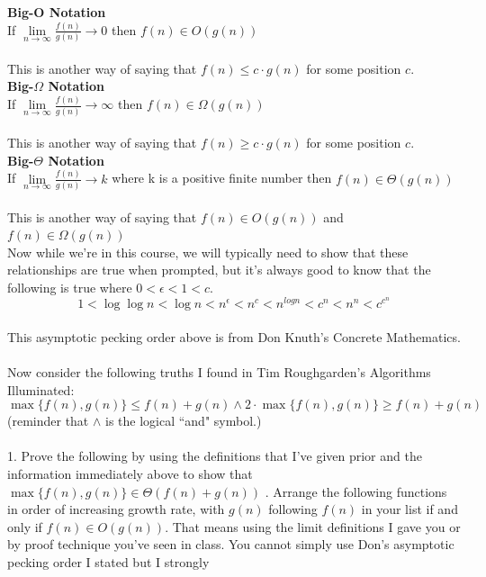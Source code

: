 \documentclass[12pt]{article}
\begin{document}
\textbf{Big-O Notation}\\
If $\lim\limits_{n\to\infty}{\frac{f(n)}{g(n)}}\to0$ then $f(n) \in O(g(n))$\\\\
This is another way of saying that $f(n) \leq c \cdot g(n)$ for some position $c$.\\
\textbf{Big-$\Omega$ Notation}\\
If $\lim\limits_{n\to\infty}{\frac{f(n)}{g(n)}}\to\infty$ then $f(n) \in \Omega(g(n))$\\\\
This is another way of saying that $f(n) \geq c \cdot g(n)$ for some position $c$.\\
\textbf{Big-$\Theta$ Notation}\\
If $\lim\limits_{n\to\infty}{\frac{f(n)}{g(n)}}\to k$ where k is a positive finite number then $f(n) \in \Theta(g(n))$\\\\
This is another way of saying that $f(n) \in O(g(n))$ and $f(n) \in \Omega(g(n))$\.\\
Now while we're in this course, we will typically need to show that these relationships are true when prompted, but it's always good to know that the following is true where \begin{math}0 < \epsilon < 1 < c\end{math}.\\
\[1 < \log{\log{n}} < \log{n} < n^{\epsilon} < n^c < n^{log{n}} < c^n < n^n < c^{c^{n}}\]\\
This asymptotic pecking order above is from Don Knuth's Concrete Mathematics.\\\\
\newpage
Now consider the following truths I found in Tim Roughgarden's Algorithms Illuminated: \\
$$\max\{f(n),g(n)\} \leq f(n) + g(n) \land  2 \cdot \max\{f(n),g(n)\} \geq f(n) + g(n)$$
(reminder that $\land$ is the logical ``and" symbol.)\\\\
1. Prove the following  by using the definitions that I've given prior and the information immediately above to show that $\max\{f(n),g(n)\}\in\Theta(f(n) + g(n))$
\newpage
{}. Arrange the following functions in order of increasing growth rate, with $g(n)$ following $f(n)$ 
in your list if and only if $f(n) \in O(g(n))$. That means using the limit definitions I gave you or by proof 
technique you've seen in class. You cannot simply use Don's asymptotic pecking order I stated but I strongly 
\end{document}
